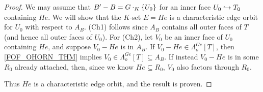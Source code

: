 \documentclass[a4paper,10pt,draft]{article}%
\begin{document}
\begin{proof}
{        We may assume that $B' - B =  G\cdot_K \left\{U_0\right\}$ for an inner face $U_0 \hookrightarrow T_0$
        containing $H e$.
        We will show that the $K$-set $E = H e$ is a characteristic edge orbit for
        $U_0$ with respect to $A_B$.
        (Ch1) follows since $A_B$ contains all outer faces of $T$ (and hence all outer faces of $U_0$).
        For (Ch2), let $V_0$ be an inner face of $U_0$ containing $H e$, 
        and suppose $V_0 - H e$ is in $A_B$.
        If $V_0 - H e \in \Lambda^{G e}_o[T]$, then \cref{FOF_OHORN_THM} implies $V_0 \in \Lambda^{G e}_o[T] \subseteq A_B$.
        If instead $V_0 - H e$ is in some $R_0$ already attached, then,
        since we know $H e \subseteq R_0$, 
        $V_0$ also factors through $R_0$.

        Thus $H e$ is a characteristic edge orbit, and the result is proven.
      } %
\end{proof}
\end{document}
